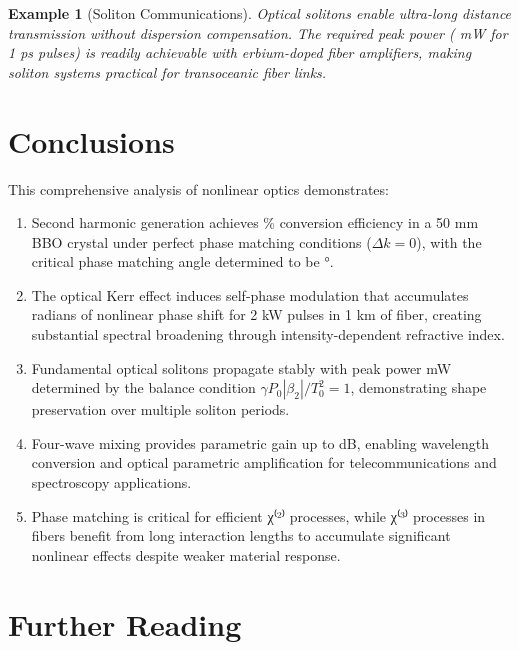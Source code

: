 \documentclass[a4paper, 11pt]{article}
\newtheorem{example}{Example}[section]
\begin{document}
\begin{example}[Soliton Communications]
Optical solitons enable ultra-long distance transmission without dispersion compensation.
The required peak power ( mW for 1 ps pulses) is readily
achievable with erbium-doped fiber amplifiers, making soliton systems practical for
transoceanic fiber links.
\end{example}

\section{Conclusions}

This comprehensive analysis of nonlinear optics demonstrates:

\begin{enumerate}
\item Second harmonic generation achieves \% conversion
efficiency in a 50 mm BBO crystal under perfect phase matching conditions ($\Delta k = 0$),
with the critical phase matching angle determined to be °.

\item The optical Kerr effect induces self-phase modulation that accumulates
 radians of nonlinear phase shift for 2 kW pulses in 1 km of
fiber, creating substantial spectral broadening through intensity-dependent refractive index.

\item Fundamental optical solitons propagate stably with peak power
 mW determined by the balance condition
$\gamma P_0 |\beta_2|/T_0^2 = 1$, demonstrating shape preservation over multiple soliton
periods.

\item Four-wave mixing provides parametric gain up to  dB,
enabling wavelength conversion and optical parametric amplification for telecommunications
and spectroscopy applications.

\item Phase matching is critical for efficient χ⁽²⁾ processes, while χ⁽³⁾ processes in
fibers benefit from long interaction lengths to accumulate significant nonlinear effects
despite weaker material response.
\end{enumerate}

\section*{Further Reading}
\end{document}
